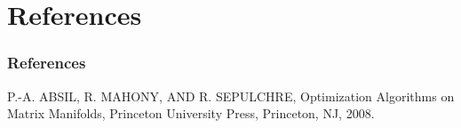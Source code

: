 \documentclass[dvipdfmx,11pt]{beamer}		%
\begin{document}
    \section*{References}
    \begin{frame}\frametitle{References}
        \begin{thebibliography}{9}
            \beamertemplatetextbibitems
             P.-A. ABSIL, R. MAHONY, AND R. SEPULCHRE, Optimization Algorithms on Matrix Manifolds, 
                       Princeton University Press, Princeton, NJ, 2008.
	    \end{thebibliography}
    \end{frame}
\end{document}
